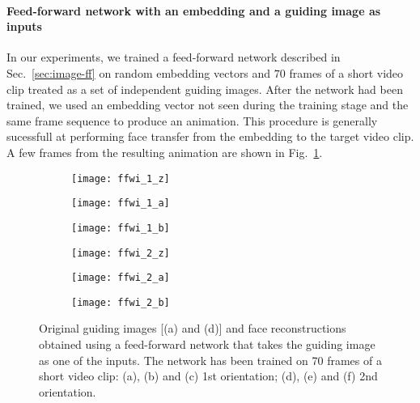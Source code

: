 \documentclass{article}
\newcommand{\Fig}[1]{Fig.~\ref{#1}}
\newcommand{\Sec}[1]{Sec.~\ref{#1}}
\begin{document}
  \paragraph{Feed-forward network with an embedding and a guiding image as inputs}
  In our experiments, we trained a feed-forward network described in \Sec{sec:image-ff} on random embedding vectors and $70$ frames of a short video clip treated as a set of independent guiding images.
  After the network had been trained, we used an embedding vector not seen during the training stage and the same frame sequence to produce an animation.
  This procedure is generally sucessfull at performing face transfer from the embedding to the target video clip.
  A few frames from the resulting animation are shown in \Fig{fig:image-ff}.
  \begin{figure}[t]
  \centering
    \begin{subfigure}{.14\textwidth}
      \centering
      \texttt{[image: ffwi\_1\_z]}
      \caption{}
    \end{subfigure}
    \begin{subfigure}{.14\textwidth}
      \centering
      \texttt{[image: ffwi\_1\_a]}
      \caption{}
    \end{subfigure}
    \begin{subfigure}{.14\textwidth}
      \centering
      \texttt{[image: ffwi\_1\_b]}
      \caption{}
    \end{subfigure}
    \begin{subfigure}{.14\textwidth}
      \centering
      \texttt{[image: ffwi\_2\_z]}
      \caption{}
    \end{subfigure}
    \begin{subfigure}{.14\textwidth}
      \centering
      \texttt{[image: ffwi\_2\_a]}
      \caption{}
    \end{subfigure}
    \begin{subfigure}{.14\textwidth}
      \centering
      \texttt{[image: ffwi\_2\_b]}
      \caption{}
    \end{subfigure}
    \caption{Original guiding images [(a) and (d)] and face reconstructions obtained using a feed-forward network that takes the guiding image as one of the inputs. The network has been trained on 70 frames of a short video clip:
    (a), (b) and (c) 1st orientation; (d), (e) and (f) 2nd orientation.}
  \label{fig:image-ff}
  \end{figure}
\end{document}
